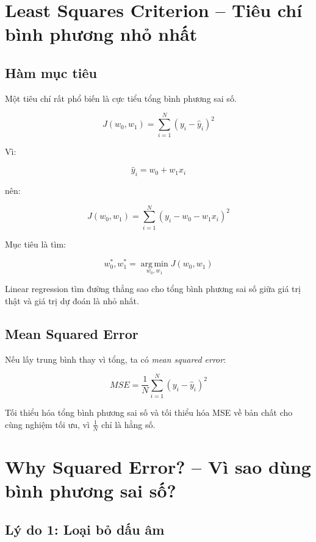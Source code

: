 \section{Least Squares Criterion -- Tiêu chí bình phương nhỏ nhất}

\subsection{Hàm mục tiêu}

Một tiêu chí rất phổ biến là cực tiểu tổng bình phương sai số.

\[
    J(w_0,w_1)
    =
    \sum_{i=1}^{N}
    \left(
    y_i-\hat{y}_i
    \right)^2
\]

Vì:

\[
    \hat{y}_i = w_0+w_1x_i
\]

nên:

\[
    J(w_0,w_1)
    =
    \sum_{i=1}^{N}
    \left(
    y_i-w_0-w_1x_i
    \right)^2
\]

Mục tiêu là tìm:

\[
    w_0^*,w_1^*
    =
    \operatorname*{arg\,min}_{w_0,w_1}
    J(w_0,w_1)
\]

\begin{ghinho}
Linear regression tìm đường thẳng sao cho tổng bình phương sai số giữa giá trị thật và giá trị dự đoán là nhỏ nhất.
\end{ghinho}

\subsection{Mean Squared Error}

Nếu lấy trung bình thay vì tổng, ta có \textit{mean squared error}:

\[
    MSE
    =
    \frac{1}{N}
    \sum_{i=1}^{N}
    \left(
    y_i-\hat{y}_i
    \right)^2
\]

Tối thiểu hóa tổng bình phương sai số và tối thiểu hóa MSE về bản chất cho cùng nghiệm tối ưu, vì $\frac{1}{N}$ chỉ là hằng số.

\section{Why Squared Error? -- Vì sao dùng bình phương sai số?}

\subsection{Lý do 1: Loại bỏ dấu âm}

